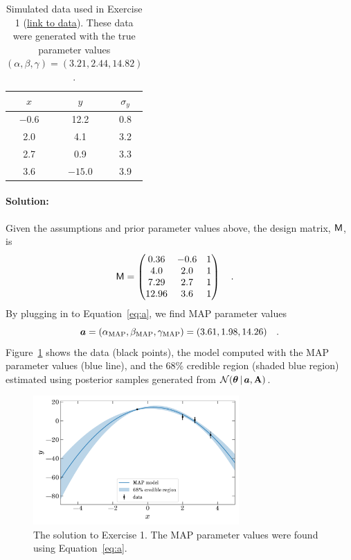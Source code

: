 \begin{table}[t!]
  \footnotesize
  \begin{center}
    \begin{tabular}{c|c|c}
      $x$ & $y$ & $\sigma_y$ \\
      \hline
      $-0.6$ & 12.2 & 0.8 \\
      2.0 & 4.1 & 3.2 \\
      2.7 & 0.9 & 3.3 \\
      3.6 & $-15.0$ & 3.9 \\
    \end{tabular}
    \caption{Simulated data used in Exercise 1
    (\href{https://raw.githubusercontent.com/davidwhogg/GaussianProductRefactor/master/notebooks/data1.csv}{link to data}).
    These data were generated with the true parameter values $(\alpha, \beta, \gamma) = (3.21, 2.44, 14.82)$.
    \label{tbl:data1}}
  \end{center}
\end{table}


\paragraph{Solution:} Given the assumptions and prior parameter values
above, the design matrix, $\mathsf{M}$, is
\begin{align}
  \mathsf{M} &= \begin{pmatrix}
      0.36 & -0.6 & 1\\
      4.0 & 2.0 & 1\\
      7.29 & 2.7 & 1\\
      12.96 & 3.6 & 1
    \end{pmatrix} \quad .
\end{align}
By plugging in to Equation~\ref{eq:a}, we find MAP parameter values
\begin{equation}
  \boldsymbol{a} =
    (\alpha_{\rm MAP}, \beta_{\rm MAP}, \gamma_{\rm MAP}) =
      (3.61, 1.98, 14.26) \quad .
\end{equation}
Figure~\ref{fig:ex1} shows the data (black points), the model computed with the
MAP parameter values (blue line), and the 68\% credible region (shaded blue
region) estimated using posterior samples generated from
$\mathcal{N}\!\,(\boldsymbol{\theta}\,|\,\boldsymbol{a},\mathbf{A})$.

\begin{figure}[t]
  \centering
  \includegraphics[width=0.7\textwidth]{exercise1.pdf}
  \caption{The solution to Exercise 1. The MAP parameter values were found using
    Equation~\ref{eq:a}.}
  \label{fig:ex1}
\end{figure}


